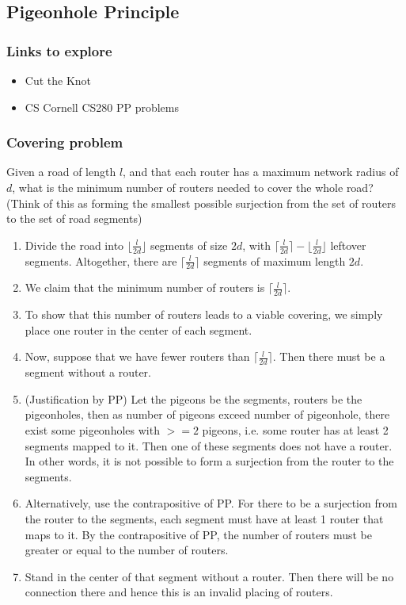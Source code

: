 \documentclass{article}
\begin{document}
\subsection{Pigeonhole Principle}
\subsubsection{Links to explore}
\begin{itemize}
    \item Cut the Knot
    \item CS Cornell CS280 PP problems
\end{itemize}

\subsubsection{Covering problem}
Given a road of length $l$, and that each router has a maximum network radius of $d$, what is the minimum number of routers needed to cover the whole road? (Think of this as forming the smallest possible surjection from the set of routers to the set of road segments)
\begin{enumerate}
    \item Divide the road into $\lfloor \frac{l}{2d} \rfloor$ segments of size $2d$, with $\lceil \frac{l}{2d} \rceil - \lfloor \frac{l}{2d} \rfloor$ leftover segments. Altogether, there are $\lceil \frac{l}{2d} \rceil$ segments of maximum length $2d$.
    \item We claim that the minimum number of routers is $\lceil \frac{l}{2d} \rceil$.
    \item To show that this number of routers leads to a viable covering, we simply place one router in the center of each segment.
    \item Now, suppose that we have fewer routers than $\lceil \frac{l}{2d} \rceil$. Then there must be a segment without a router.
    \item (Justification by PP) Let the pigeons be the segments, routers be the pigeonholes, then as number of pigeons exceed number of pigeonhole, there exist some pigeonholes with $>= 2$ pigeons, i.e. some router has at least 2 segments mapped to it. Then one of these segments does not have a router. 
    In other words, it is not possible to form a surjection from the router to the segments.
    \item Alternatively, use the contrapositive of PP. For there to be a surjection from the router to the segments, each segment must have at least 1 router that maps to it. By the contrapositive of PP, the number of routers must be greater or equal to the number of routers.
    \item Stand in the center of that segment without a router. Then there will be no connection there and hence this is an invalid placing of routers.
\end{enumerate}
\end{document}
